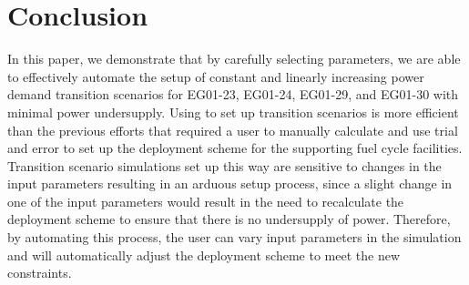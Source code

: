 \section{Conclusion}
In this paper, we demonstrate that by carefully selecting 
\deploy parameters, we are able to 
effectively automate the setup of constant and 
linearly increasing power demand transition scenarios
for EG01-23, EG01-24, EG01-29, and EG01-30 with minimal 
power undersupply. 
Using \deploy to set up transition scenarios 
is more efficient than the previous efforts that
required a user to manually calculate and use trial and error 
to set up the deployment scheme for the supporting fuel cycle 
facilities. 
Transition scenario simulations set up this way are sensitive 
to changes in the input parameters resulting in an 
arduous setup process, since a slight change in one 
of the input parameters would result in the need to recalculate 
the deployment scheme to ensure that there is no undersupply 
of power.   
Therefore, by automating this process, the user can vary input parameters 
in the simulation and \deploy will automatically adjust the
deployment scheme to meet the new constraints. 